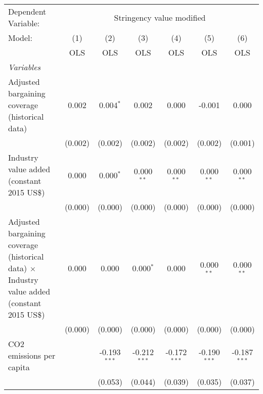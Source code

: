 
\begingroup
\centering
\begin{tabular}{lcccccc}
   \toprule
   Dependent Variable: & \multicolumn{6}{c}{Stringency value modified}\\
   Model:                                                                                              & (1)     & (2)            & (3)            & (4)            & (5)            & (6)\\  
                                                                                                       &  OLS    & OLS            & OLS            & OLS            & OLS            & OLS\\  
   \midrule
   \emph{Variables}\\
   Adjusted bargaining coverage (historical data)                                                      & 0.002   & 0.004$^{*}$    & 0.002          & 0.000          & -0.001         & 0.000\\   
                                                                                                       & (0.002) & (0.002)        & (0.002)        & (0.002)        & (0.002)        & (0.001)\\   
   Industry value added (constant 2015 US\$)                                                           & 0.000   & 0.000$^{*}$    & 0.000$^{**}$   & 0.000$^{**}$   & 0.000$^{**}$   & 0.000$^{**}$\\   
                                                                                                       & (0.000) & (0.000)        & (0.000)        & (0.000)        & (0.000)        & (0.000)\\   
   Adjusted bargaining coverage (historical data) $\times$ Industry value added (constant 2015 US\$)   & 0.000   & 0.000          & 0.000$^{*}$    & 0.000          & 0.000$^{**}$   & 0.000$^{**}$\\   
                                                                                                       & (0.000) & (0.000)        & (0.000)        & (0.000)        & (0.000)        & (0.000)\\   
   CO2 emissions per capita                                                                            &         & -0.193$^{***}$ & -0.212$^{***}$ & -0.172$^{***}$ & -0.190$^{***}$ & -0.187$^{***}$\\   
                                                                                                       &         & (0.053)        & (0.044)        & (0.039)        & (0.035)        & (0.037)\\   

\end{tabular}
